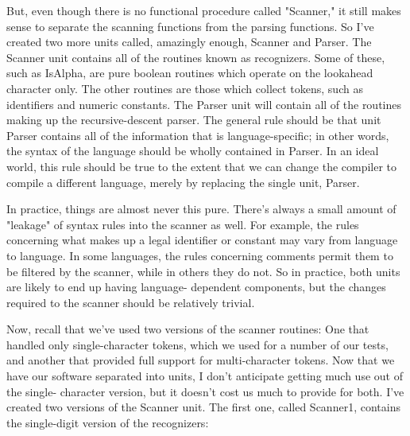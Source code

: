 But, even though there is no functional procedure called "Scanner," it still makes sense to separate the scanning functions from the parsing functions. So I've created two more units called, amazingly enough, Scanner and Parser. The Scanner unit contains all of the routines known as recognizers. Some of these, such as IsAlpha, are pure boolean routines which operate on the lookahead character only. The other routines are those which collect tokens, such as identifiers and numeric constants. The Parser unit will contain all of the routines making up the recursive-descent parser. The general rule should be that unit Parser contains all of the information that is language-specific; in other words, the syntax of the language should be wholly contained in Parser. In an ideal world, this rule should be true to the extent that we can change the compiler to compile a different language, merely by replacing the single unit, Parser.

In practice, things are almost never this pure. There's always a small amount of "leakage" of syntax rules into the scanner as well. For example, the rules concerning what makes up a legal identifier or constant may vary from language to language. In some languages, the rules concerning comments permit them to be filtered by the scanner, while in others they do not. So in practice, both units are likely to end up having language- dependent components, but the changes required to the scanner should be relatively trivial.

Now, recall that we've used two versions of the scanner routines: One that handled only single-character tokens, which we used for a number of our tests, and another that provided full support for multi-character tokens. Now that we have our software separated into units, I don't anticipate getting much use out of the single- character version, but it doesn't cost us much to provide for both. I've created two versions of the Scanner unit. The first one, called Scanner1, contains the single-digit version of the recognizers:

